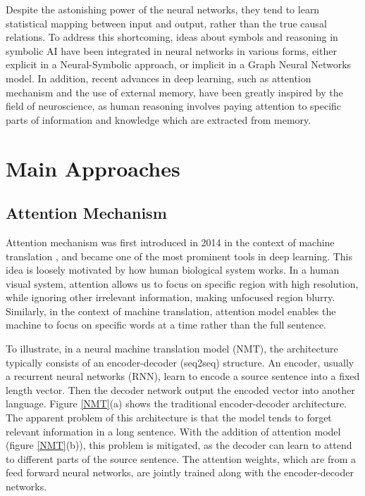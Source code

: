 \documentclass[journal]{IEEEtran}
\begin{document}
Despite the astonishing power of the neural networks, they tend to learn statistical mapping between input and output, rather than the true causal relations. 
To address this shortcoming, ideas about symbols and reasoning in symbolic AI have been integrated in neural networks in various forms, 
either explicit in a Neural-Symbolic approach, or implicit in a Graph Neural Networks model.
In addition, recent advances in deep learning, such as attention mechanism and the use of external memory, have been greatly inspired by the field of neuroscience, as 
human reasoning involves paying attention to specific parts of information and knowledge which are extracted from memory.

\section{Main Approaches}
\subsection{Attention Mechanism}
Attention mechanism was first introduced in 2014 in the context of machine translation \cite{bahdanau2014neural}, 
and became one of the most prominent tools in deep learning. 
This idea is loosely motivated by how human biological system works. 
In a human visual system, attention allows us to focus on specific region with high resolution, 
while ignoring other irrelevant information, making unfocused region blurry.
Similarly, in the context of machine translation, attention model enables the machine to focus on specific words at a time 
rather than the full sentence.

To illustrate, in a neural machine translation model (NMT), the architecture typically consists of an encoder-decoder (seq2seq) structure.
An encoder, usually a recurrent neural networks (RNN), learn to encode a source sentence into a fixed length vector.
Then the decoder network output the encoded vector into another language. Figure \ref{NMT}(a) shows the traditional encoder-decoder architecture.
The apparent problem of this architecture is that the model tends to forget relevant information in a long sentence.
With the addition of attention model (figure \ref{NMT}(b)), this problem is mitigated, 
as the decoder can learn to attend to different parts of the source sentence. 
The attention weights, which are from a feed forward neural networks, are jointly trained along with the encoder-decoder networks.
\end{document}
